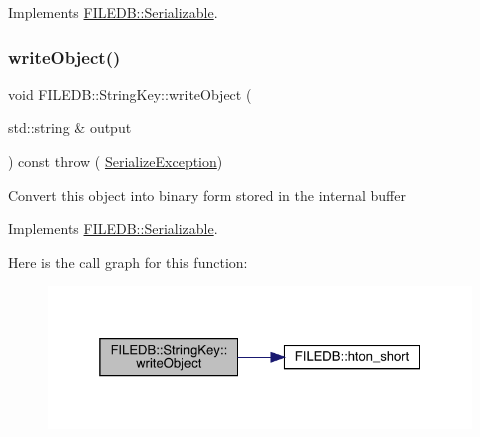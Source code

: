 Implements \mbox{\hyperlink{classFILEDB_1_1Serializable_a8deaa86e108c08c863881e46cf5578ea}{F\+I\+L\+E\+D\+B\+::\+Serializable}}.

\mbox{\label{classFILEDB_1_1StringKey_a29db7eea425c851c5e0a4336d7a85fb1}} 
\subsubsection{\texorpdfstring{writeObject()}{writeObject()}\hspace{0.1cm}{\footnotesize\ttfamily [2/3]}}
{\footnotesize\ttfamily void F\+I\+L\+E\+D\+B\+::\+String\+Key\+::write\+Object (\begin{DoxyParamCaption}\item[{std\+::string \&}]{output }\end{DoxyParamCaption}) const throw ( \mbox{\hyperlink{classFILEDB_1_1SerializeException}{Serialize\+Exception}}) \hspace{0.3cm}{\ttfamily [virtual]}}

Convert this object into binary form stored in the internal buffer 

Implements \mbox{\hyperlink{classFILEDB_1_1Serializable_a8deaa86e108c08c863881e46cf5578ea}{F\+I\+L\+E\+D\+B\+::\+Serializable}}.

Here is the call graph for this function\+:
\nopagebreak
\begin{figure}[H]
\begin{center}
\leavevmode
\includegraphics[width=325pt]{d2/da7/classFILEDB_1_1StringKey_a29db7eea425c851c5e0a4336d7a85fb1_cgraph}
\end{center}
\end{figure}
\mbox{\label{classFILEDB_1_1StringKey_a29db7eea425c851c5e0a4336d7a85fb1}} 
